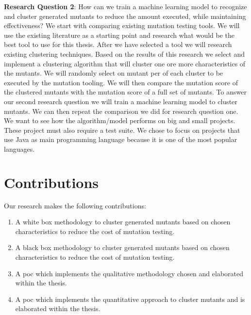 \documentclass[../main]{subfiles}
\begin{document}
\textbf{Research Question 2}: How can we train a machine learning model to recognize and cluster generated mutants to reduce the amount executed, while maintaining effectiveness?
\newline
We start with comparing existing mutation testing tools. 
We will use the existing literature as a starting point and research what would be the best tool to use for this thesis.
\newline
After we have selected a tool we will research existing clustering techniques.
Based on the results of this research we select and implement a clustering algorithm that will cluster one ore more characteristics of the mutants. 
We will randomly select on mutant per of each cluster to be executed by the mutation tooling.
We will then compare the mutation score of the clustered mutants with the mutation score of a full set of mutants.
\newline
To answer our second research question we will train a machine learning model to cluster mutants.
We can then repeat the comparison we did for research question one. 
\newline
We want to see how the algorithm/model performs on big and small projects.
These project must also require a test suite.
\newline
We chose to focus on projects that use Java as main programming language because it is one of the most popular languages\cite{Tiobe}.

\section{Contributions}
Our research makes the following contributions:
\begin{enumerate}
 \item A white box methodology to cluster generated mutants based on chosen characteristics to reduce the cost of mutation testing.
  \item A black box methodology to cluster generated mutants based on chosen characteristics to reduce the cost of mutation testing.
 \item A \acrfull{poc} which implements the qualitative methodology chosen and elaborated within the thesis.
 \item A \acrfull{poc} which implements the quantitative approach to cluster mutants and is elaborated within the thesis. 
\end{enumerate}
\end{document}
